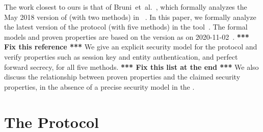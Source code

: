 \documentclass[runningheads, envcountsame, hidelinks, a4paper, draft, x11names]{llncs}
\begin{document}
%
The work closest to ours is that of Bruni~et~al.~\cite{DBLP:conf/secsr/BruniJPS18},
which formally analyzes the May 2018 version of \mEdhoc{} (with two methods) in
\mProverif~\cite{DBLP:conf/csfw/Blanchet01}.
%
%
In this paper, we formally analyze the latest version of the \mEdhoc{} protocol (with five methods) in the \mTamarin{}
tool~\cite{DBLP:conf/cav/MeierSCB13}.
%
%
The formal models and proven properties are based on the version as on
2020-11-02~\cite{selander-lake-edhoc-01}. \textbf{*** Fix this reference ***}
%
We give an explicit security model for the protocol and verify
properties such as session key and entity authentication, and perfect forward
secrecy, for all five methods. \textbf{*** Fix this list at the end ***}
%
We also discuss the relationship between proven properties and the claimed
security properties, in the absence of a precise security model in the \mSpec.
%
%

\section{The \mEdhoc{} Protocol}
\label{sec:edhoc}

\end{document}

